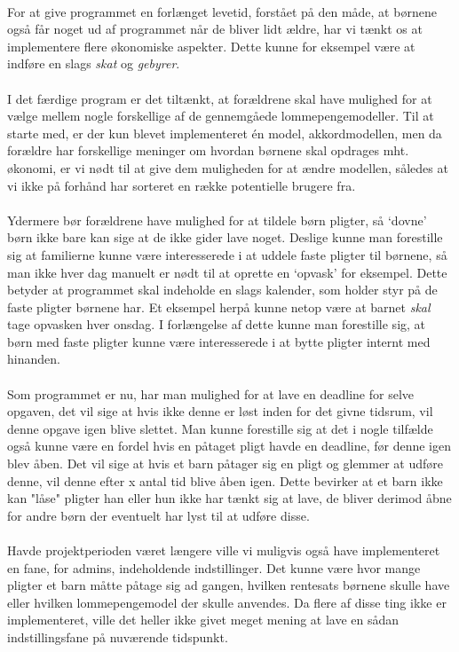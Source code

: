 \\
For at give programmet en forlænget levetid, forstået på den måde, at børnene også får noget ud af programmet når de bliver lidt ældre, har vi tænkt os at implementere flere økonomiske aspekter. Dette kunne for eksempel være at indføre en slags \textit{skat} og \textit{gebyrer}.\\
\\
I det færdige program er det tiltænkt, at forældrene skal have mulighed for at vælge mellem nogle forskellige af de gennemgåede lommepengemodeller. Til at starte med, er der kun blevet implementeret én model, akkordmodellen, men da forældre har forskellige meninger om hvordan børnene skal opdrages mht. økonomi, er vi nødt til at give dem muligheden for at ændre modellen, således at vi ikke på forhånd har sorteret en række potentielle brugere fra.\\
\\
Ydermere bør forældrene have mulighed for at tildele børn pligter, så ‘dovne’ børn ikke bare kan sige at de ikke gider lave noget. Deslige kunne man forestille sig at familierne kunne være interesserede i at uddele faste pligter til børnene, så man ikke hver dag manuelt er nødt til at oprette en ‘opvask’ for eksempel. Dette betyder at programmet skal indeholde en slags kalender, som holder styr på de faste pligter børnene har. Et eksempel herpå kunne netop være at barnet \textit{skal} tage opvasken hver onsdag. I forlængelse af dette kunne man forestille sig, at børn med faste pligter kunne være interesserede i at bytte pligter internt med hinanden.\\
\\
Som programmet er nu, har man mulighed for at lave en deadline for selve opgaven, det vil sige at hvis ikke denne er løst inden for det givne tidsrum, vil denne opgave igen blive slettet. Man kunne forestille sig at det i nogle tilfælde også kunne være en fordel hvis en påtaget pligt havde en deadline, før denne igen blev åben. Det vil sige at hvis et barn påtager sig en pligt og glemmer at udføre denne, vil denne efter x antal tid blive åben igen. Dette bevirker at et barn ikke kan "låse" pligter han eller hun ikke har tænkt sig at lave, de bliver derimod åbne for andre børn der eventuelt har lyst til at udføre disse.\\
\\
Havde projektperioden været længere ville vi muligvis også have implementeret en fane, for admins, indeholdende indstillinger. Det kunne være hvor mange pligter et barn måtte påtage sig ad gangen, hvilken rentesats børnene skulle have eller hvilken lommepengemodel der skulle anvendes. Da flere af disse ting ikke er implementeret, ville det heller ikke givet meget mening at lave en sådan indstillingsfane på nuværende tidspunkt.